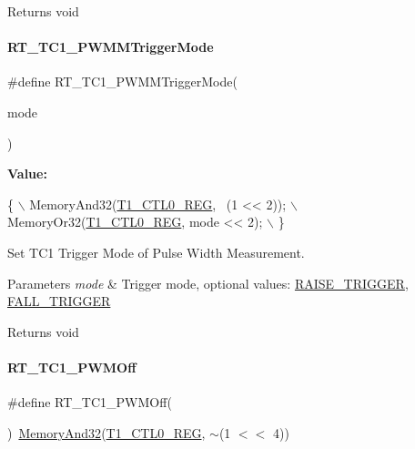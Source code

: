 \begin{DoxyReturn}{Returns}
void 
\end{DoxyReturn}
\mbox{\label{a00044_a326645a1e9eb49468e696ba7a186cdba}} 
\paragraph{\texorpdfstring{R\+T\+\_\+\+T\+C1\+\_\+\+P\+W\+M\+M\+Trigger\+Mode}{RT\_TC1\_PWMMTriggerMode}}
{\footnotesize\ttfamily \#define R\+T\+\_\+\+T\+C1\+\_\+\+P\+W\+M\+M\+Trigger\+Mode(\begin{DoxyParamCaption}\item[{}]{mode }\end{DoxyParamCaption})}

{\bfseries Value\+:}
\begin{DoxyCode}
\{                                        \(\backslash\)
        MemoryAnd32(\mbox{\hyperlink{a00020_a55600694c3c73a1019f78d306f474fa1}{T1\_CTL0\_REG}}, ~(1 << 2)); \(\backslash\)
        MemoryOr32(\mbox{\hyperlink{a00020_a55600694c3c73a1019f78d306f474fa1}{T1\_CTL0\_REG}}, mode << 2);  \(\backslash\)
    \}
\end{DoxyCode}


Set T\+C1 Trigger Mode of Pulse Width Measurement. 


\begin{DoxyParams}{Parameters}
{\em mode} & Trigger mode, optional values\+: \mbox{\hyperlink{a00020_abda90eda34a640b130f48a6ade23fe22}{R\+A\+I\+S\+E\+\_\+\+T\+R\+I\+G\+G\+ER}}, \mbox{\hyperlink{a00020_a9bbaf5b9e2125c7597249c7113b20e6c}{F\+A\+L\+L\+\_\+\+T\+R\+I\+G\+G\+ER}} \\
\hline
\end{DoxyParams}
\begin{DoxyReturn}{Returns}
void 
\end{DoxyReturn}
\mbox{\label{a00044_afbffb90a80851e9a1e6e3dc03938c547}} 
\paragraph{\texorpdfstring{R\+T\+\_\+\+T\+C1\+\_\+\+P\+W\+M\+Off}{RT\_TC1\_PWMOff}}
{\footnotesize\ttfamily \#define R\+T\+\_\+\+T\+C1\+\_\+\+P\+W\+M\+Off(\begin{DoxyParamCaption}{ }\end{DoxyParamCaption})~\mbox{\hyperlink{a00020_ad87cedffcaadc51db22594fce55173d4}{Memory\+And32}}(\mbox{\hyperlink{a00020_a55600694c3c73a1019f78d306f474fa1}{T1\+\_\+\+C\+T\+L0\+\_\+\+R\+EG}}, $\sim$(1 $<$$<$ 4))}



